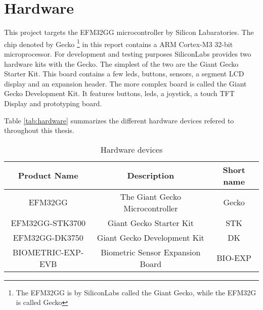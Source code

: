 \section{Hardware}
\label{sec:back:hw}

This project targets the EFM32GG microcontroller by Silicon Labaratories.
The chip denoted by Gecko \footnote{The EFM32GG is by SiliconLabs called the Giant Gecko, while the EFM32G is called Gecko} in this report contains a ARM Cortex-M3 32-bit microprocessor.
For development and testing purposes SiliconLabs provides two hardware kits with the Gecko.
The simplest of the two are the Giant Gecko Starter Kit.
This board contains a few leds, buttons, sensors, a segment LCD display and an expansion header.
The more complex board is called the Giant Gecko Development Kit.
It features buttons, leds, a joystick, a touch TFT Display and prototyping board.

Table \ref{tab:hardware} summarizes the different hardware devices refered to throughout this thesis.

\begin{table}[H]
  \begin{tabular}{|c|c|c|}
    \hline
    Product Name & Description & Short name \\
    \hline
    \hline
    EFM32GG & The Giant Gecko Microcontroller & Gecko \\
    \hline
    EFM32GG-STK3700 & Giant Gecko Starter Kit & STK \\
    \hline
    EFM32GG-DK3750 & Giant Gecko Development Kit & DK \\
    \hline
    BIOMETRIC-EXP-EVB & Biometric Sensor Expansion Board & BIO-EXP \\
    \hline
  \end{tabular}
  \caption{Hardware devices}
  \label{tab:hw:boards}
\end{table}
